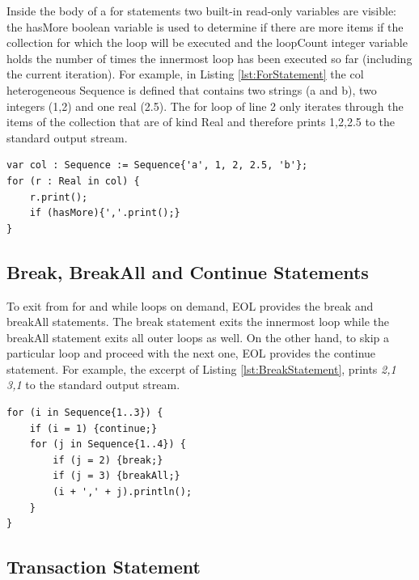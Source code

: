 Inside the body of a for statements two built-in read-only variables are visible: the hasMore boolean variable is used to determine if there are more items if the collection for which the loop will be executed and the loopCount integer variable holds the number of times the innermost loop has been executed so far (including the current iteration). For example, in Listing \ref{lst:ForStatement} the col heterogeneous Sequence is defined that contains two strings (a and b), two integers (1,2) and one real (2.5). The for loop of line 2 only iterates through the items of the collection that are of kind Real and therefore prints 1,2,2.5 to the standard output stream.

\begin{lstlisting}[basicstyle=\ttfamily\footnotesize, flexiblecolumns=true, numbers=none, nolol=true, caption=Example of a for statement, label=lst:ForStatement, numbers=left, language=EOL, tabsize=2]
var col : Sequence := Sequence{'a', 1, 2, 2.5, 'b'};
for (r : Real in col) {
	r.print();
	if (hasMore){','.print();}
}
\end{lstlisting}

\subsection{Break, BreakAll and Continue Statements}

To exit from for and while loops on demand, EOL provides the break and breakAll statements. The break statement exits the innermost loop while the breakAll statement exits all outer loops as well. On the other hand, to skip a particular loop and proceed with the next one, EOL provides the continue statement. For example, the excerpt of Listing \ref{lst:BreakStatement}, prints \textit{2,1 3,1} to the standard output stream.

\begin{lstlisting}[basicstyle=\ttfamily\footnotesize, flexiblecolumns=true, numbers=none, nolol=true, caption=Example of the break\, breakAll and continue statements, label=lst:BreakStatement, numbers=left, language=EOL, tabsize=2]
for (i in Sequence{1..3}) {
	if (i = 1) {continue;}
	for (j in Sequence{1..4}) {
		if (j = 2) {break;}
		if (j = 3) {breakAll;}
		(i + ',' + j).println();
	}
}
\end{lstlisting}

\subsection{Transaction Statement}

